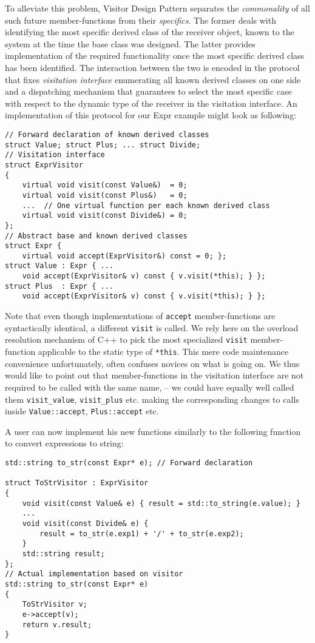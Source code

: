 \documentclass[preprint]{sigplanconf}
\DeclareRobustCommand{\code}[1]{{\lstinline[breaklines=false]{#1}}}
\begin{document}
To alleviate this problem, Visitor Design Pattern separates the 
\emph{commonality} of all such future member-functions from their 
\emph{specifics}. The former deals with identifying the most specific derived 
class of the receiver object, known to the system at the time the base class was 
designed. The latter provides implementation of the required functionality once 
the most specific derived class has been identified. The interaction between the 
two is encoded in the protocol that fixes \emph{visitation interface} 
enumerating all known derived classes on one side and a dispatching mechanism 
that guarantees to select the most specific case with respect to the dynamic 
type of the receiver in the visitation interface. An implementation of this 
protocol for our Expr example might look as following:

\begin{lstlisting}
// Forward declaration of known derived classes
struct Value; struct Plus; ... struct Divide;
// Visitation interface
struct ExprVisitor
{
    virtual void visit(const Value&)  = 0;
    virtual void visit(const Plus&)   = 0;
    ...  // One virtual function per each known derived class
    virtual void visit(const Divide&) = 0;
};
// Abstract base and known derived classes
struct Expr { 
    virtual void accept(ExprVisitor&) const = 0; };
struct Value : Expr { ...
    void accept(ExprVisitor& v) const { v.visit(*this); } };
struct Plus  : Expr { ...
    void accept(ExprVisitor& v) const { v.visit(*this); } };
\end{lstlisting}

Note that even though implementations of \code{accept} member-functions are 
syntactically identical, a different \code{visit} is called. We rely here on the 
overload resolution mechanism of C++ to pick the most specialized \code{visit} 
member-function applicable to the static type of \code{*this}. This mere code 
maintenance convenience unfortunately, often confuses novices on what 
is going on. We thus would like to point out that member-functions in the 
visitation interface are not required to be called with the same name, -- we 
could have equally well called them \code{visit_value}, \code{visit_plus} etc. 
making the corresponding changes to calls inside \code{Value::accept}, 
\code{Plus::accept} etc.

A user can now implement his new functions similarly to the following function 
to convert expressions to string:

\begin{lstlisting}
std::string to_str(const Expr* e); // Forward declaration

struct ToStrVisitor : ExprVisitor
{
    void visit(const Value& e) { result = std::to_string(e.value); }
    ...
    void visit(const Divide& e) { 
        result = to_str(e.exp1) + '/' + to_str(e.exp2); 
    }
    std::string result;
};
// Actual implementation based on visitor
std::string to_str(const Expr* e)
{
    ToStrVisitor v;
    e->accept(v);
    return v.result;
}
\end{lstlisting}
\end{document}
